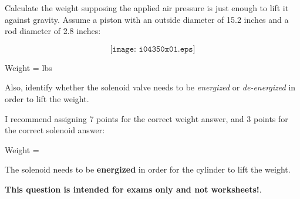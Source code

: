 

Calculate the weight supposing the applied air pressure is just enough to lift it against gravity.  Assume a piston with an outside diameter of 15.2 inches and a rod diameter of 2.8 inches:

$$\texttt{[image: i04350x01.eps]}$$

Weight = \underbar{\hskip 50pt} lbs

\vskip 10pt

Also, identify whether the solenoid valve needs to be {\it energized} or {\it de-energized} in order to lift the weight.







I recommend assigning 7 points for the correct weight answer, and 3 points for the correct solenoid answer:

\vskip 10pt

Weight = 

\vskip 10pt

The solenoid needs to be {\bf energized} in order for the cylinder to lift the weight.







{\bf This question is intended for exams only and not worksheets!}.



